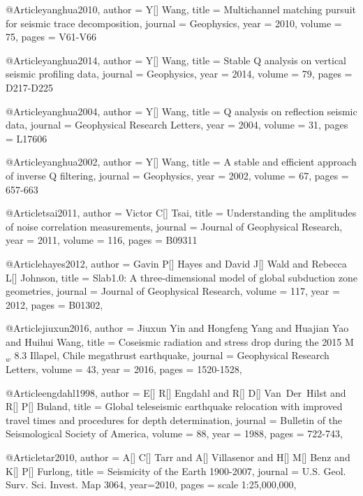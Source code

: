 @Article{yanghua2010,
  author = 	 {Y[] Wang},
  title = 	 {Multichannel matching pursuit for seismic trace decomposition},
  journal = 	 {Geophysics},
  year = 	 2010,
  volume =	 75,
  pages =	 {V61-V66}
}

@Article{yanghua2014,
  author = 	 {Y[] Wang},
  title = 	 {Stable Q analysis on vertical seismic profiling data},
  journal = 	 {Geophysics},
  year = 	 2014,
  volume =	 79,
  pages =	 {D217-D225}
}

@Article{yanghua2004,
  author = 	 {Y[] Wang},
  title = 	 {Q analysis on reflection seismic data},
  journal = 	 {Geophysical Research Letters},
  year = 	 2004,
  volume =	 31,
  pages =	 {L17606}
}

@Article{yanghua2002,
  author = 	 {Y[] Wang},
  title = 	 {A stable and efficient approach of inverse Q filtering},
  journal = 	 {Geophysics},
  year = 	 2002,
  volume = 67,
  pages =	 {657-663}
}

@Article{tsai2011,
  author = 	 {Victor C[] Tsai},
  title = 	 {Understanding the amplitudes of noise correlation measurements},
  journal = 	 {Journal of Geophysical Research},
  year = 	 2011,
  volume = 116,
  pages =	 {B09311}
}

@Article{hayes2012,
  author =	 { Gavin P[] Hayes and David J[] Wald and Rebecca L[] Johnson},
  title =	 {Slab1.0: A three-dimensional model of global subduction zone geometries},
  journal =	 {Journal of Geophysical Research},
  volume =	 117,
  year =	 2012,
  pages =	 {B01302},
}

@Article{jiuxun2016,
  author =	 { Jiuxun Yin and Hongfeng Yang and Huajian Yao and Huihui Wang},
  title =	 {Coseismic radiation and stress drop during the 2015 {M}$_w$ 8.3 {I}llapel, {C}hile megathrust earthquake},
  journal =	 {Geophysical Research Letters},
  volume =	 43,
  year =	 2016,
  pages =	 {1520-1528},
}

@Article{engdahl1998,
  author =	 {E[] R[] Engdahl and R[] D[]  Van~Der~Hilst and R[] P[] Buland},
  title =	 {Global teleseismic earthquake relocation with improved travel times and procedures for depth determination},
  journal =	 {Bulletin of the Seismological Society of America},
  volume =	 88,
  year =	 1988,
  pages =	 {722-743},
}

@Article{tar2010,
  author =	 {A[] C[] Tarr and A[] Villasenor and H[] M[] Benz and K[] P[] Furlong},
  title =	 {Seismicity of the {E}arth 1900-2007},
  journal =	 {U.S. Geol. Surv. Sci. Invest. Map 3064},
  year=2010,
  pages =	 {scale 1:25,000,000},
}


